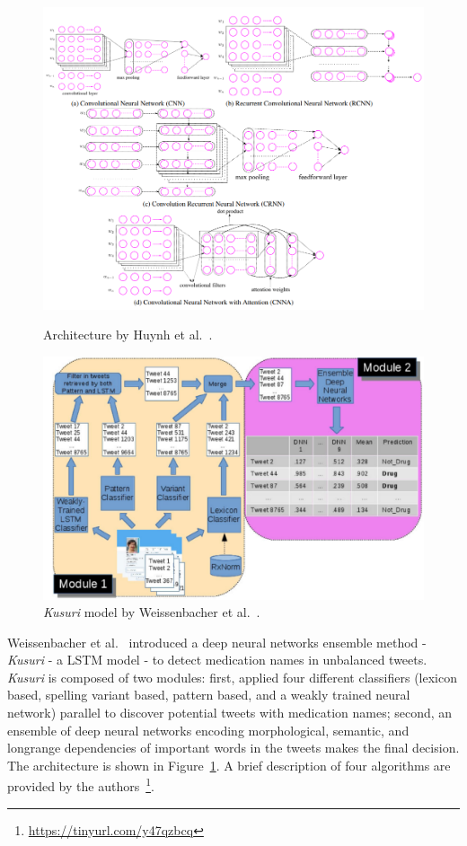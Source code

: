 \begin{figure}[h]
	\centering
	\begin{minipage}{0.45\textwidth}
		\includegraphics[width=0.99\linewidth]{Figures/e.png}
		\caption{Architecture by Huynh et al.~\cite{huynh2016adverse}.}
		\label{fig:architecture-huynh}		
	\end{minipage}
	\hfill
	\begin{minipage}{0.45\textwidth}
		\includegraphics[width=0.99\linewidth]{Figures/a.png}
		\caption{\textit{Kusuri} model by Weissenbacher et al.~\cite{weissenbacher2019deep}.}
		\label{fig:architecture-weissenbacher}
	\end{minipage}
\end{figure}


Weissenbacher et al.~\cite{weissenbacher2019deep} introduced a deep neural networks ensemble method - \textit{Kusuri} - a LSTM model - to detect medication names in unbalanced tweets. \textit{Kusuri} is composed of two modules: first, applied four different classifiers (lexicon based, spelling variant based, pattern based, and a weakly trained neural network) parallel to discover potential tweets with medication names; second, an ensemble of deep neural networks encoding morphological, semantic, and longrange dependencies of important words in the tweets makes the final decision. The architecture is shown in Figure~\ref{fig:architecture-weissenbacher}. A brief description of four algorithms are provided by the authors~\footnote{\url{https://tinyurl.com/y47qzbcq}}. 

